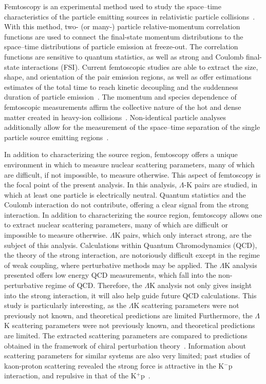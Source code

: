 \documentclass[ALICE,manyauthors]{cernphprep}
\newcommand{\Lam}{$\Lambda$\xspace}
\newcommand{\LamK}{$\Lambda$K\xspace}
\begin{document}
Femtoscopy is an experimental method used to study the space--time characteristic{\color{blue}s} of the particle emitting sources in relativistic particle collisions{\color{blue}~\cite{Lisa:2005dd, Kopylov:1972qw}}.  
With this method, two- (or many-) particle relative-momentum correlation functions are used to connect the final-state momentum distributions to the space--time distributions of particle emission at freeze-out.  
The correlation functions are sensitive to quantum statistics, as well as strong and Coulomb final-state interactions (FSI).  
Current femtoscopic studies are able to extract the size, shape, and orientation of the pair emission regions, as well as offer {\color{red}estimations} {\color{blue}estimates} of the total time to reach kinetic decoupling and the {\color{red}suddenness} {\color{blue}duration} of particle emission~\cite{Lisa:2005dd, Lisa:2008gf}.
The momentum and species dependence of femtoscopic measurements affirm the collective nature of the hot and dense matter created in heavy-ion collisions~\cite{Makhlin:1987gm, Akkelin:1995gh, Retiere:2003kf, Kisiel:2009eh}.
Non-identical particle analyses additionally allow for the measurement of the space--time separation of the single particle source {\color{red}emitting} regions~\cite{Lednicky:1995vk, Voloshin:1997jh, Lednicky:2001qv, Retiere:2003kf}.

{\color{red}In addition to characterizing the source region, femtoscopy offers a unique environment in which to measure nuclear scattering parameters, many of which are difficult, if not impossible, to measure otherwise.  
This aspect of femtoscopy is the focal point of the present analysis. 
In this analysis, \Lam-K pairs are studied, in which at least one particle is electrically neutral.  
Quantum statistics and the Coulomb interaction do not contribute, offering a clear signal from the strong interaction.}
{\color{blue}In addition to characterizing the source region, femtoscopy allows one to extract nuclear scattering parameters, many of which are difficult or impossible to measure otherwise.  
\LamK pairs, which only interact strong, are the subject of this analysis.}
Calculations within Quantum Chromodynamics (QCD), the theory of the strong interaction, are notoriously difficult except in the regime of weak coupling, where perturbative methods may be applied. 
The \LamK analysis presented offers low energy QCD measurements, which fall into the non-perturbative regime of QCD.
Therefore, the \LamK analysis not only gives insight into the strong interaction, it will also help guide future QCD calculations.
{\color{red}This study is particularly interesting, as the \LamK scattering parameters were not previously not known, and theoretical predictions are limited}
{\color{blue}Furthermore, the \LamK scattering parameters were not previously known, and theoretical predictions are limited.}
The extracted scattering parameters are compared to predictions obtained in the framework of chiral perturbation theory~\cite{Liu:2006xja,Mai:2009ce}.
{\color{blue}Information about} scattering parameters for similar systems are also very limited; past studies of kaon-proton scattering revealed the strong force is attractive in the K$^{-}$p interaction, and repulsive in that of the K$^{+}$p~\cite{Humphrey:1962zz, Hadjimichef:2002xe, Ikeda:2012au}.
\end{document}
